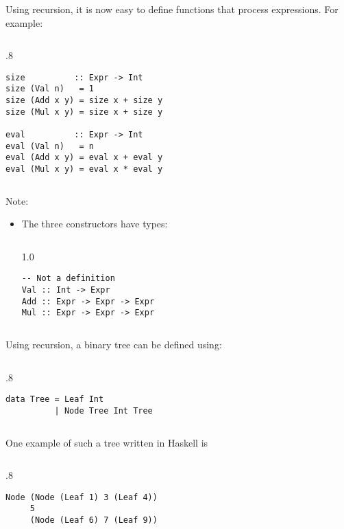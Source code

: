 \documentclass{beamer}
\newenvironment{codeblock}[1][.8]{%
\begin{columns}
\begin{column}{#1\linewidth}
\begin{exampleblock}{}}{%
\end{exampleblock}
\end{column}
\end{columns}}
\newenvironment{execblock}[1][.8]{%
\begin{columns}
\begin{column}{#1\linewidth}
\begin{block}{}}{%
\end{block}
\end{column}
\end{columns}}
\def\frameskip{\vskip 0.1in}
\begin{document}
\begin{frame}[fragile]

\Large
Using recursion, it is now easy to define functions 
that process expressions.  For example: 

\frameskip

\begin{codeblock}
\begin{verbatim}
size          :: Expr -> Int 
size (Val n)   = 1 
size (Add x y) = size x + size y 
size (Mul x y) = size x + size y 

eval          :: Expr -> Int 
eval (Val n)   = n 
eval (Add x y) = eval x + eval y 
eval (Mul x y) = eval x * eval y
\end{verbatim}
\end{codeblock}


\end{frame}

\begin{frame}[fragile]
\LARGE

Note: 
\begin{itemize}
\item 
The three constructors have types: 

\begin{execblock}[1.0]
\begin{verbatim}
-- Not a definition
Val :: Int -> Expr 
Add :: Expr -> Expr -> Expr 
Mul :: Expr -> Expr -> Expr 
\end{verbatim}
\end{execblock}

\end{itemize}

\end{frame}


\begin{frame}[fragile]

\Large
Using recursion, a binary tree can be defined using:

\frameskip

\begin{codeblock}
\begin{verbatim}
data Tree = Leaf Int 
          | Node Tree Int Tree 
\end{verbatim}
\end{codeblock}
\frameskip

One example of such a tree written in Haskell is
\frameskip
\begin{execblock}
\begin{verbatim}
Node (Node (Leaf 1) 3 (Leaf 4)) 
     5 
     (Node (Leaf 6) 7 (Leaf 9))
\end{verbatim}
\end{execblock}
\frameskip
\end{frame}
\end{document}
